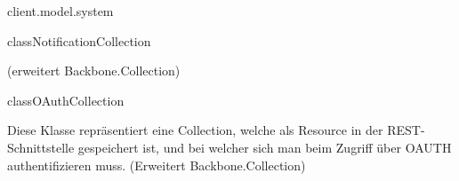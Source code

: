 \begin{texdocpackage}{client.model.system}
\begin{texdocclass}{class}{NotificationCollection}
\begin{texdocclassintro}
 (erweitert Backbone.Collection)\end{texdocclassintro}
\begin{texdocclassfields}
\end{texdocclassfields}
\begin{texdocclassconstructors}
\end{texdocclassconstructors}
\begin{texdocclassmethods}
\end{texdocclassmethods}
\end{texdocclass}


\begin{texdocclass}{class}{OAuthCollection}
\label{texdoclet:edu.kit.informatik.studyplan.client.model.system.OAuthCollection}
\begin{texdocclassintro}
Diese Klasse repräsentiert eine Collection, welche als Resource in der
 REST-Schnittstelle gespeichert ist, und bei welcher sich man beim Zugriff
 über OAUTH authentifizieren muss. (Erweitert Backbone.Collection)\end{texdocclassintro}
\begin{texdocclassfields}
\end{texdocclassfields}
\begin{texdocclassconstructors}
\end{texdocclassconstructors}
\end{texdocclass}



\end{texdocpackage}
